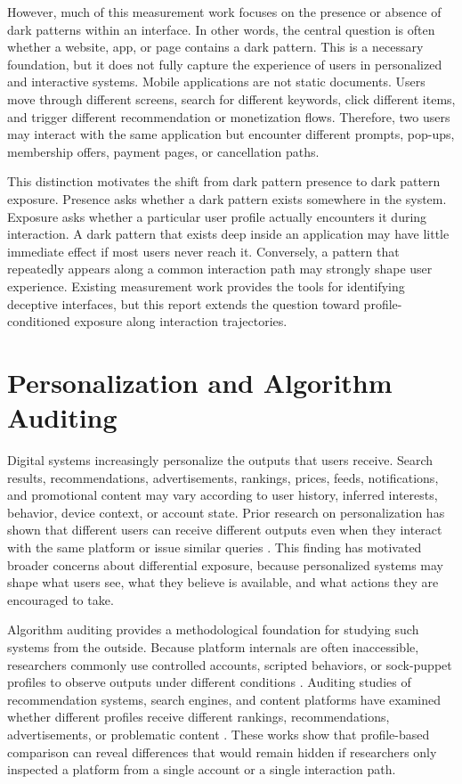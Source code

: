 However, much of this measurement work focuses on the presence or absence of dark patterns within an interface. In other words, the central question is often whether a website, app, or page contains a dark pattern. This is a necessary foundation, but it does not fully capture the experience of users in personalized and interactive systems. Mobile applications are not static documents. Users move through different screens, search for different keywords, click different items, and trigger different recommendation or monetization flows. Therefore, two users may interact with the same application but encounter different prompts, pop-ups, membership offers, payment pages, or cancellation paths.

This distinction motivates the shift from dark pattern presence to dark pattern exposure. Presence asks whether a dark pattern exists somewhere in the system. Exposure asks whether a particular user profile actually encounters it during interaction. A dark pattern that exists deep inside an application may have little immediate effect if most users never reach it. Conversely, a pattern that repeatedly appears along a common interaction path may strongly shape user experience. Existing measurement work provides the tools for identifying deceptive interfaces, but this report extends the question toward profile-conditioned exposure along interaction trajectories.

\section{Personalization and Algorithm Auditing}

Digital systems increasingly personalize the outputs that users receive. Search results, recommendations, advertisements, rankings, prices, feeds, notifications, and promotional content may vary according to user history, inferred interests, behavior, device context, or account state. Prior research on personalization has shown that different users can receive different outputs even when they interact with the same platform or issue similar queries \cite{hannak2013personalization}. This finding has motivated broader concerns about differential exposure, because personalized systems may shape what users see, what they believe is available, and what actions they are encouraged to take.

Algorithm auditing provides a methodological foundation for studying such systems from the outside. Because platform internals are often inaccessible, researchers commonly use controlled accounts, scripted behaviors, or sock-puppet profiles to observe outputs under different conditions \cite{sandvig2014auditing}. Auditing studies of recommendation systems, search engines, and content platforms have examined whether different profiles receive different rankings, recommendations, advertisements, or problematic content \cite{ribeiro2020auditing,haroon2023youtubeaudit,srba2023youtube}. These works show that profile-based comparison can reveal differences that would remain hidden if researchers only inspected a platform from a single account or a single interaction path.

